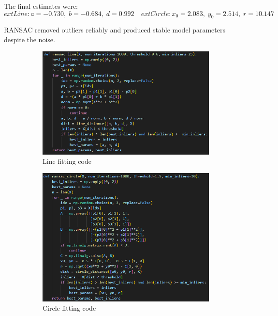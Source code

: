 \documentclass[12pt,a4paper]{article}
\begin{document}
The final estimates were:
\[
	ext{Line: } a=-0.730,\; b=-0.684,\; d=0.992
\quad
	ext{Circle: } x_0=2.083,\; y_0=2.514,\; r=10.147
\]

RANSAC removed outliers reliably and produced stable model parameters despite the noise.

\begin{figure}[H]\centering
\begin{subfigure}{0.23\textwidth}
\includegraphics[width=\linewidth]{images/q2_1_code.png}
\caption{Line fitting code}
\end{subfigure}
\begin{subfigure}{0.23\textwidth}
\includegraphics[width=\linewidth]{images/q2_2_code.png}
\caption{Circle fitting code}
\end{subfigure}
\begin{subfigure}{0.23\textwidth}

\end{subfigure}
\end{figure}
\end{document}
